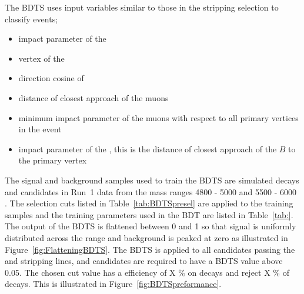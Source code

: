 The BDTS uses input variables similar to those in the stripping selection to classify events;
\begin{itemize}
\item impact parameter \chisqd of the \bs
\item vertex \chisqd of the \bs
\item direction cosine of \bs
\item distance of closest approach of the muons
\item minimum impact parameter \chisqd of the muons with respect to all primary vertices in the event
\item impact parameter of the \bs, this is the distance of closest approach of the $B$ to the primary vertex
\end{itemize}
The signal and background samples used to train the BDTS are simulated \bsmumu decays and \bsmumu candidates in Run~1 data from the mass ranges 4800 - 5000 \mevcc and 5500 - 6000 \mevcc. The selection cuts listed in Table~\ref{tab:BDTSpresel} are applied to the training samples and the training parameters used in the BDT are listed in Table~\ref{tab:}. The output of the BDTS is flattened between 0 and 1 so that signal is uniformly distributed across the range and background is peaked at zero as illustrated in Figure~\ref{fig:FlatteningBDTS}. The BDTS is applied to all candidates passing the \bmumu and \bhh stripping lines, and candidates are required to have a BDTS value above 0.05. The chosen cut value has a efficiency of X $\%$ on \bsmumu decays and reject X $\%$ of \bbbarmumux decays. This is illustrated in Figure~\ref{fig:BDTSpreformance}. 

